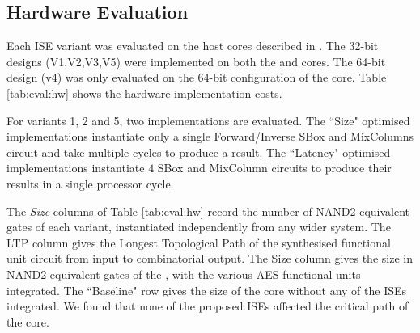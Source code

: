 
\subsection{Hardware Evaluation}
\label{sec:eval:sw}

Each ISE variant was evaluated on the host cores
described in .
The 32-bit designs (V1,V2,V3,V5) were implemented on both the
 and  cores.
The 64-bit design (v4) was only evaluated on the 64-bit configuration
of the  core.
Table \ref{tab:eval:hw} shows the hardware implementation costs.

For variants 1, 2 and 5, two implementations are evaluated.
The ``Size" optimised implementations instantiate only a single
Forward/Inverse SBox and MixColumns circuit and take multiple cycles
to produce a result.
The ``Latency" optimised implementations instantiate $4$ SBox and
MixColumn circuits to produce their results in a single processor cycle.

The {\em Size} columns of Table \ref{tab:eval:hw} 
record the number of NAND2 equivalent gates of each variant,
instantiated independently from any wider system.
The LTP column gives the Longest Topological Path of the synthesised
functional unit circuit from input to combinatorial output.
The  Size column gives the size in NAND2 equivalent gates of the
, with the various AES functional units integrated.
The ``Baseline" row gives the size of the core without any of the
ISEs integrated.
We found that none of the proposed ISEs affected the critical
path of the  core.



